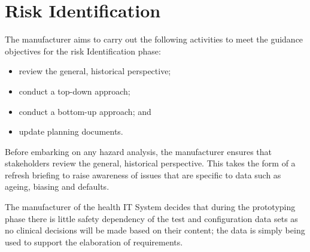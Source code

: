 \section{Risk Identification}
\begin{minipage}[t]{0.73\textwidth}
  The manufacturer aims to carry out the following activities to meet the guidance objectives for the risk Identification phase:
  \begin{itemize}
    \item review the general, historical perspective;
    \item conduct a top-down approach;
    \item conduct a bottom-up approach; and
    \item update planning documents.
  \end{itemize}
\end{minipage}
\begin{minipage}[t]{0.25\textwidth}
  \centering{}
\end{minipage}

Before embarking on any hazard analysis, the manufacturer ensures that \glspl{stakeholder} review the general, historical perspective. This takes the form of a refresh briefing to raise awareness of issues that are specific to data such as ageing, biasing and defaults.

The manufacturer of the health IT System decides that during the prototyping phase there is little safety dependency of the test and \gls{configuration data} sets as no clinical decisions will be made based on their content; the data is simply being used to support the elaboration of requirements.

